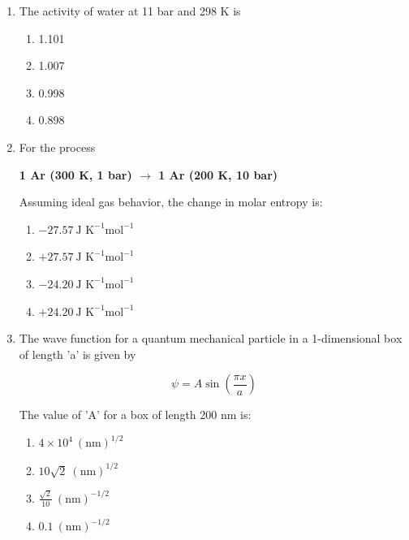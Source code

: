 \documentclass[journal,12pt,onecolumn]{IEEEtran}
\theoremstyle{remark}
\begin{document}
\begin{enumerate}
 

\item    \hspace{0.5 cm} The activity of water at 11 bar and 298 K is  \hfill{}

\begin{multicols}{2}
\begin{enumerate}
    \item 1.101
    \item 1.007
    \item 0.998
    \item 0.898
\end{enumerate}
\end{multicols}

 

\item    \hspace{0.5 cm} For the process  \hfill{}

\begin{center}
\textbf{1 Ar (300 K, 1 bar) $\rightarrow$ 1 Ar (200 K, 10 bar)}
\end{center}

Assuming ideal gas behavior, the change in molar entropy is:

\begin{multicols}{2}
\begin{enumerate}
    \item $-27.57 \ \text{J K}^{-1} \text{mol}^{-1}$
    \item $+27.57 \ \text{J K}^{-1} \text{mol}^{-1}$
    \item $-24.20 \ \text{J K}^{-1} \text{mol}^{-1}$
    \item $+24.20 \ \text{J K}^{-1} \text{mol}^{-1}$
\end{enumerate}
\end{multicols}

 

\item    \hspace{0.5 cm} The wave function for a quantum mechanical particle in a 1-dimensional box of length 'a' is given by  \hfill{}

\[
\psi = A \sin\left(\frac{\pi x}{a}\right)
\]

The value of 'A' for a box of length 200 nm is:

\begin{multicols}{2}
\begin{enumerate}
    \item $4 \times 10^4 \ (\text{nm})^{1/2}$
    \item $10\sqrt{2} \ (\text{nm})^{1/2}$
    \item $\frac{\sqrt{2}}{10} \ (\text{nm})^{-1/2}$
    \item $0.1 \ (\text{nm})^{-1/2}$
\end{enumerate}
\end{multicols}


\end{enumerate}
\end{document}
